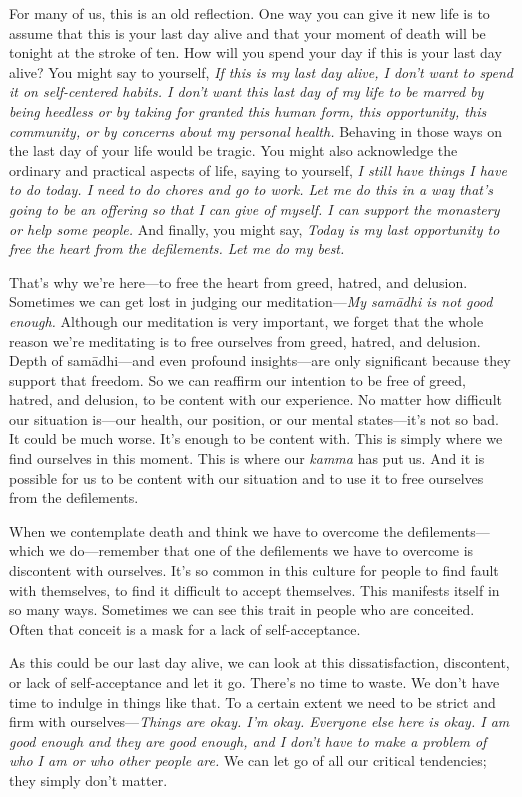 For many of us, this is an old reflection. One way you can give it new 
life is to assume that this is your last day alive and that your moment 
of death will be tonight at the stroke of ten. How will you spend your 
day if this is your last day alive? You might say to yourself, \emph{If 
this is my last day alive, I don't want to spend it on self-centered 
habits. I don't want this last day of my life to be marred by being 
heedless or by taking for granted this human form, this opportunity, 
this community, or by concerns about my personal health.} Behaving in 
those ways on the last day of your life would be tragic. You might also 
acknowledge the ordinary and practical aspects of life, saying to 
yourself, \emph{I still have things I have to do today. I need to do 
chores and go to work. Let me do this in a way that's going to be an 
offering so that I can give of myself. I can support the monastery or 
help some people.} And finally, you might say, \emph{Today is my last 
opportunity to free the heart from the defilements. Let me do my best.}

That's why we're here---to free the heart from greed, hatred, and 
delusion. Sometimes we can get lost in judging our 
meditation---\emph{My samādhi is not good enough.} Although our 
meditation is very important, we forget that the whole reason we're 
meditating is to free ourselves from greed, hatred, and delusion. Depth 
of samādhi---and even profound insights---are only significant because 
they support that freedom. So we can reaffirm our intention to be free 
of greed, hatred, and delusion, to be content with our experience. No 
matter how difficult our situation is---our health, our position, or 
our mental states---it's not so bad. It could be much worse. It's 
enough to be content with. This is simply where we find ourselves in 
this moment. This is where our \emph{kamma} has put us. And it is 
possible for us to be content with our situation and to use it to free 
ourselves from the defilements.

When we contemplate death and think we have to overcome the 
defilements---which we do---remember that one of the defilements we 
have to overcome is discontent with ourselves. It's so common in this 
culture for people to find fault with themselves, to find it difficult 
to accept themselves. This manifests itself in so many ways. Sometimes 
we can see this trait in people who are conceited. Often that conceit 
is a mask for a lack of self-acceptance.

As this could be our last day alive, we can look at this 
dissatisfaction, discontent, or lack of self-acceptance and let it go. 
There's no time to waste. We don't have time to indulge in things like 
that. To a certain extent we need to be strict and firm with 
ourselves---\emph{Things are okay. I'm okay. Everyone else here is 
okay. I am good enough and they are good enough, and I don't have to 
make a problem of who I am or who other people are.} We can let go of 
all our critical tendencies; they simply don't matter.

